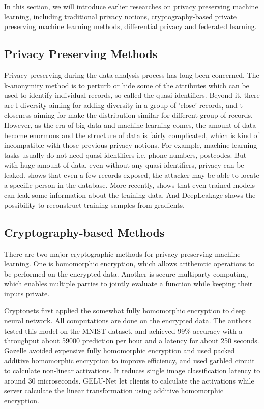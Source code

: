 In this section, we will introduce earlier researches on privacy preserving machine learning, including traditional privacy notions, cryptography-based private preserving machine learning methods, differential privacy and federated learning.

\subsection{Privacy Preserving Methods}
Privacy preserving during the data analysis process has long been concerned. The k-anonymity\cite{k-anonymity} method is to perturb or hide some of the attributes which can be used to identify individual records, so-called the quasi identifiers. Beyond it, there are l-diversity\cite{l-diversity} aiming for adding diversity in a group of 'close' records, and t-closeness\cite{t-closeness} aiming for make the distribution similar for different group of records. However, as the era of big data and machine learning comes, the amount of data become enormous and the structure of data is fairly complicated, which is kind of incompatible with those previous privacy notions. For example, machine learning tasks usually do not need quasi-identifiers i.e. phone numbers, postcodes. But with huge amount of data, even without any quasi identifiers, privacy can be leaked. \cite{Narayanan2006netflixleak} shows that even a few records exposed, the attacker may be able to locate a specific person in the database. More recently, \cite{fredrikson2015inversion} shows that even trained models can leak some information about the training data. And DeepLeakage\cite{zhuligeng2019deepleakage} shows the possibility to reconstruct training samples from gradients.

\subsection{Cryptography-based Methods}
There are two major cryptographic methods for privacy preserving machine learning. One is homomorphic encryption, which allows arithemtic operations to be performed on the encrypted data. Another is secure multiparty computing, which enables multiple parties to jointly evaluate a function while keeping their inputs private.

Cryptonets\cite{bachrach2016cryptonets} first applied the somewhat fully homomorphic encryption to deep neural network. All computations are done on the encrypted data. The authors tested this model on the MNIST dataset, and achieved 99\% accuracy with a throughput about 59000 prediction per hour and a latency for about 250 seconds. Gazelle\cite{juvekar2018gazelle} avoided expensive fully homomorphic encryption and used packed additive homomorphic encryption to improve efficiency, and used garbled circuit to calculate non-linear activations. It reduces single image classification latency to around 30 microseconds. GELU-Net\cite{zhangqiao2019gelunet} let clients to calculate the activations while server calculate the linear transformation using additive homomorphic encryption. 

